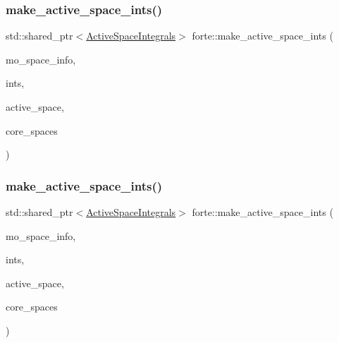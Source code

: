 \mbox{\label{namespaceforte_a4b7c57446accee4d18e10e0dab0f64aa}} 
\subsubsection{\texorpdfstring{make\+\_\+active\+\_\+space\+\_\+ints()}{make\_active\_space\_ints()}\hspace{0.1cm}{\footnotesize\ttfamily [1/2]}}
{\footnotesize\ttfamily std\+::shared\+\_\+ptr$<$\mbox{\hyperlink{classforte_1_1_active_space_integrals}{Active\+Space\+Integrals}}$>$ forte\+::make\+\_\+active\+\_\+space\+\_\+ints (\begin{DoxyParamCaption}\item[{std\+::shared\+\_\+ptr$<$ \mbox{\hyperlink{classforte_1_1_m_o_space_info}{forte\+::\+M\+O\+Space\+Info}} $>$}]{mo\+\_\+space\+\_\+info,  }\item[{std\+::shared\+\_\+ptr$<$ \mbox{\hyperlink{classforte_1_1_forte_integrals}{Forte\+Integrals}} $>$}]{ints,  }\item[{const std\+::string \&}]{active\+\_\+space,  }\item[{const std\+::vector$<$ std\+::string $>$ \&}]{core\+\_\+spaces }\end{DoxyParamCaption})}

\mbox{\label{namespaceforte_a6cd30049e8325ac99bb6c83ca12cf682}} 
\subsubsection{\texorpdfstring{make\+\_\+active\+\_\+space\+\_\+ints()}{make\_active\_space\_ints()}\hspace{0.1cm}{\footnotesize\ttfamily [2/2]}}
{\footnotesize\ttfamily std\+::shared\+\_\+ptr$<$\mbox{\hyperlink{classforte_1_1_active_space_integrals}{Active\+Space\+Integrals}}$>$ forte\+::make\+\_\+active\+\_\+space\+\_\+ints (\begin{DoxyParamCaption}\item[{std\+::shared\+\_\+ptr$<$ \mbox{\hyperlink{classforte_1_1_m_o_space_info}{M\+O\+Space\+Info}} $>$}]{mo\+\_\+space\+\_\+info,  }\item[{std\+::shared\+\_\+ptr$<$ \mbox{\hyperlink{classforte_1_1_forte_integrals}{Forte\+Integrals}} $>$}]{ints,  }\item[{const std\+::string \&}]{active\+\_\+space,  }\item[{const std\+::vector$<$ std\+::string $>$ \&}]{core\+\_\+spaces }\end{DoxyParamCaption})}

